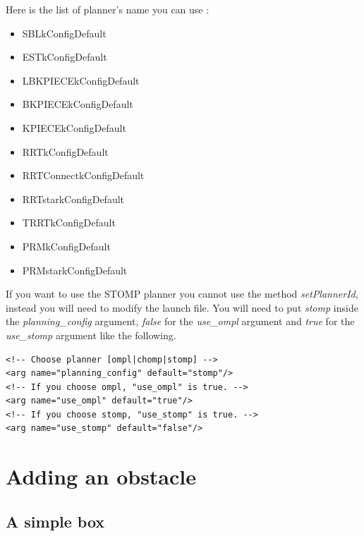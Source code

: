 Here is the list of planner's name you can use :
\begin{itemize}
\item SBLkConfigDefault
\item ESTkConfigDefault
\item LBKPIECEkConfigDefault
\item BKPIECEkConfigDefault
\item KPIECEkConfigDefault
\item RRTkConfigDefault
\item RRTConnectkConfigDefault
\item RRTstarkConfigDefault
\item TRRTkConfigDefault
\item PRMkConfigDefault
\item PRMstarkConfigDefault
\end{itemize}

If you want to use the STOMP planner you cannot use the method \emph{setPlannerId}, instead you will need to modify the launch file. You will need to put \emph{stomp} inside the \emph{planning\_config} argument, \emph{false} for the \emph{use\_ompl} argument and \emph{true} for the \emph{use\_stomp} argument like the following. 



\begin{lstlisting}
<!-- Choose planner [ompl|chomp|stomp] -->
<arg name="planning_config" default="stomp"/>
<!-- If you choose ompl, "use_ompl" is true. -->
<arg name="use_ompl" default="true"/>
<!-- If you choose stomp, "use_stomp" is true. -->
<arg name="use_stomp" default="false"/>
\end{lstlisting}


\section{Adding an obstacle}
\subsection{A simple box}

